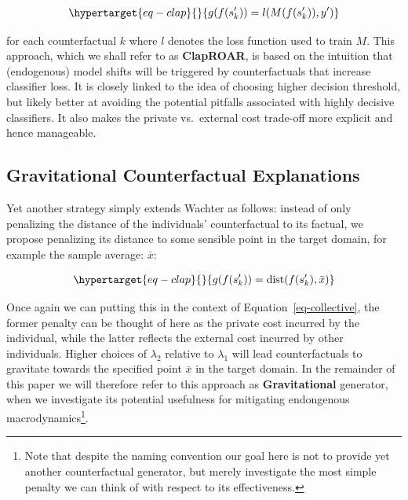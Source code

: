 \documentclass[
  conference]{IEEEtran}
\begin{document}
\begin{equation}\protect\hypertarget{eq-clap}{}{
\begin{aligned}
g(f(s_k^\prime)) = l(M(f(s_k^\prime)),y^\prime)
\end{aligned}
}\label{eq-clap}\end{equation}

for each counterfactual \(k\) where \(l\) denotes the loss function used
to train \(M\). This approach, which we shall refer to as
\textbf{ClapROAR}, is based on the intuition that (endogenous) model
shifts will be triggered by counterfactuals that increase classifier
loss. It is closely linked to the idea of choosing higher decision
threshold, but likely better at avoiding the potential pitfalls
associated with highly decisive classifiers. It also makes the private
vs.~external cost trade-off more explicit and hence manageable.

\hypertarget{gravitational-counterfactual-explanations}{%
\subsection{Gravitational Counterfactual
Explanations}\label{gravitational-counterfactual-explanations}}

Yet another strategy simply extends Wachter as follows: instead of only
penalizing the distance of the individuals' counterfactual to its
factual, we propose penalizing its distance to some sensible point in
the target domain, for example the sample average: \(\bar{x}\):

\begin{equation}\protect\hypertarget{eq-clap}{}{
\begin{aligned}
g(f(s_k^\prime)) = \text{dist}(f(s_k^\prime),\bar{x})
\end{aligned}
}\label{eq-clap}\end{equation}

Once again we can putting this in the context of
Equation~\ref{eq-collective}, the former penalty can be thought of here
as the private cost incurred by the individual, while the latter
reflects the external cost incurred by other individuals. Higher choices
of \(\lambda_2\) relative to \(\lambda_1\) will lead counterfactuals to
gravitate towards the specified point \(\bar{x}\) in the target domain.
In the remainder of this paper we will therefore refer to this approach
as \textbf{Gravitational} generator, when we investigate its potential
usefulness for mitigating endongenous macrodynamics\footnote{Note that
  despite the naming convention our goal here is not to provide yet
  another counterfactual generator, but merely investigate the most
  simple penalty we can think of with respect to its effectiveness.}.
\end{document}
